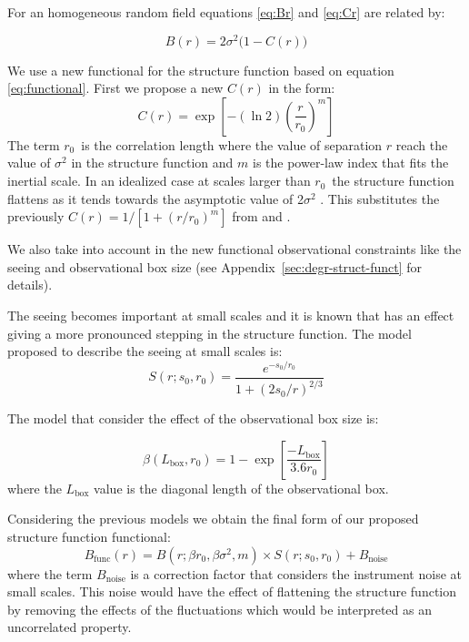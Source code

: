 \documentclass[fleqn,usenatbib, useAMS, a4paper]{mnras}
\begin{document}
For an homogeneous random field equations \ref{eq:Br} and \ref{eq:Cr} are related by:

\begin{equation}\label{eq:functional}
B(r) = 2\sigma^2 \bigl( 1 - C(r) \bigr)
\end{equation}

We use a new functional for the structure function based on equation \ref{eq:functional}. 
First we propose a new \(C(r)\) in the form:
%
\begin{equation}\label{eq:ffnew}
  C(r) = \exp \left[ -(\ln 2) \left( \frac{r}{r_0} \right)^m \right]
\end{equation}
%
The term \(r_{0}\)\ is the correlation length where the value of separation \(r\) reach the value of \(\sigma^2\) in the structure function and $m$ is the power-law index that fits the inertial scale.
In an idealized case at scales larger than \(r_{0}\)\ the structure function flattens as it tends towards the asymptotic value of 2\(\sigma^2\) \citep{arthur2016turbulence}.
This substitutes the previously \(C(r) = 1/[1+(r/r_{0})^{m}]\) from \citet{1966igd..book.....K} and
\citet{1984ApJ...277..556S}.

We also take into account in the new functional observational constraints like the seeing and observational box size (see Appendix~\ref{sec:degr-struct-funct} for details). 

The seeing becomes important at small scales and it is known that has an effect giving a more pronounced stepping in the structure function.
The model proposed to describe the seeing at small scales is:
%
\begin{equation}\label{eq:ffs}
  S(r; s_0, r_0) = \frac{
    e^{-s_0 / r_0}
  }{
    1+(2s_0 / r)^{2 / 3}
  }
\end{equation}

The model that consider the effect of the observational box size is:

\begin{equation}\label{eq:ffb}
  \beta(L_{\text{box}},r_0) = 1 - \exp \left[ \frac{-L_{\text{box}}} {3.6 r_0} \right] 
\end{equation}
%
where the \(L_{\text{box}}\) value is the diagonal length of the observational box.

Considering the previous models we obtain the final form of our proposed structure function functional:
%
\begin{equation}\label{eq:proposed-functional}
B_{\text{func}}(r) = B(r; \beta r_0, \beta \sigma^2,m) \times S(r; s_0, r_0) + B_{\text{noise}}
\end{equation}
%
where the term \( B_{\text{noise}}\) is a correction factor that considers the instrument noise at small scales.
This noise would have the effect of flattening the structure function by removing the effects of the fluctuations which would be interpreted as an uncorrelated property. 
\end{document}
